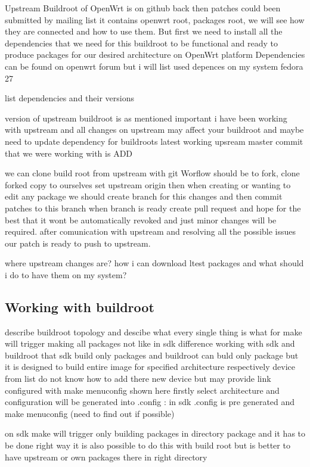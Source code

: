 Upstream Buildroot of OpenWrt is on github back then patches could been submitted by mailing list
it contains openwrt root, packages root, we will see how they are connected and how to use them.
But first we need to install all the dependencies that we need for this buildroot to be functional and ready to produce packages for our desired architecture on OpenWrt platform
Dependencies can be found on openwrt forum but i will list used depences on my system fedora 27

list dependencies and their versions

version of upstream buildroot is as mentioned important i have been working with upstream and all changes on upstream may affect your buildroot and maybe need to update dependency for buildroots
latest working upsream master commit that we were working with is ADD

we can clone build root from upstream with git Worflow should be to fork, clone forked copy to ourselves set upstream origin then when creating or wanting to edit any package we should create branch for this changes and then commit patches to this branch
when branch is ready create pull request and hope for the best that it wont be automatically revoked and just minor changes will be required.
after comunication with upstream and resolving all the possible issues our patch is ready to push to upstream.

where upstream changes are? how i can download ltest packages and what should i do to have them on my system?

\subsection{Working with buildroot}

describe buildroot topology and descibe what every single thing is what for
make will trigger making all packages not like in sdk
difference working with sdk and buildroot that sdk build only packages and buildroot can buld only package but it is designed to build entire image
for specified architecture respectively device from list
do not know how to add there new device but may provide link
configured with make menuconfig shown here firstly select architecture and configuration will be generated into .config :
in sdk .config is pre generated and make menuconfig (need to find out if possible)

on sdk make will trigger only building packages in directory package and it has to be done right way
it is also possible to do this with build root but is better to have upstream or own packages there in right directory

